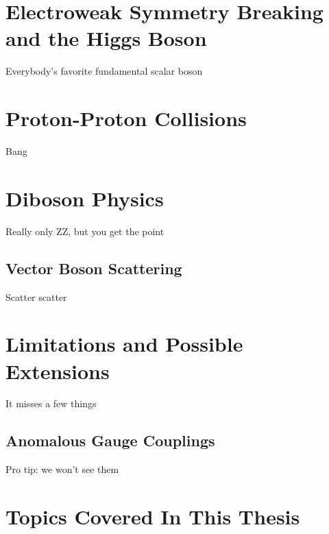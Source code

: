 \section{Electroweak Symmetry Breaking and the Higgs Boson}
Everybody's favorite fundamental scalar boson



\section{Proton-Proton Collisions}\label{sec:pp}
Bang



\section{Diboson Physics}
Really only ZZ, but you get the point

\subsection{Vector Boson Scattering}
Scatter scatter


\section{Limitations and Possible Extensions}
It misses a few things

\subsection{Anomalous Gauge Couplings}
Pro tip: we won't see them



\section{Topics Covered In This Thesis}
